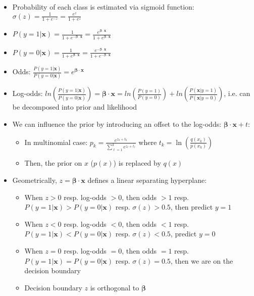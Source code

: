 \begin{itemize}
    \item Probability of each class is estimated via sigmoid function: $\sigma(z) = \frac{1}{1+e^{-z}} = \frac{e^{z}}{1+e^{z}}$
    \item $P(y=1|\boldsymbol{x}) = \frac{1}{1+e^{-\boldsymbol{\beta} \cdot \boldsymbol{x}}} = \frac{e^{\boldsymbol{\beta} \cdot \boldsymbol{x}}}{1+e^{\boldsymbol{\beta} \cdot \boldsymbol{x}}}$
    \item $P(y=0|\boldsymbol{x}) = \frac{1}{1+e^{\boldsymbol{\beta} \cdot \boldsymbol{x}}} = \frac{e^{-\boldsymbol{\beta} \cdot \boldsymbol{x}}}{1+e^{-\boldsymbol{\beta} \cdot \boldsymbol{x}}}$
    \item Odds: $\frac{P(y=1|\boldsymbol{x})}{P(y=0|\boldsymbol{x})} = e^{\boldsymbol{\beta} \cdot \boldsymbol{x}}$
    \item Log-odds: $ln(\frac{P(y=1|\boldsymbol{x})}{P(y=0|\boldsymbol{x})}) = \boldsymbol{\beta} \cdot \boldsymbol{x} = ln(\frac{P(y=1)}{P(y=0)}) + ln(\frac{P(\boldsymbol{x}|y=1)}{P(\boldsymbol{x}|y=0)})$, i.e. can be decomposed into prior and likelihood
    \item We can influence the prior by introducing an offset to the log-odds: $\boldsymbol{\beta} \cdot \boldsymbol{x} + t$:
    \begin{itemize}
        \item In multinomial case: $
        p_k = \frac{e^{z_k + t_k}}{\sum_{\ell=1}^k e^{z_\ell + t_\ell}}
        $ where $t_k = \ln(\frac{q(x_k)}{p(x_k)})$
        \item Then, the prior on $x$ ($p(x)$) is replaced by $q(x)$
    \end{itemize}
    \item Geometrically, $z = \boldsymbol{\beta} \cdot \boldsymbol{x}$ defines a linear separating hyperplane:
    \begin{itemize}
        \item When $z > 0$ resp. log-odds $> 0$, then odds $> 1$ resp. $P(y=1|\boldsymbol{x}) > P(y=0|\boldsymbol{x})$ resp. $\sigma(z) > 0.5$, then predict $y = 1$
        \item When $z < 0$ resp. log-odds $< 0$, then odds $< 1$ resp. $P(y=1|\boldsymbol{x}) < P(y=0|\boldsymbol{x})$ resp. $\sigma(z) < 0.5$, predict $y = 0$
        \item When $z = 0$ resp. log-odds $= 0$, then odds $= 1$ resp. $P(y=1|\boldsymbol{x}) = P(y=0|\boldsymbol{x})$ resp. $\sigma(z) = 0.5$, then we are on the decision boundary
        \item Decision boundary $z$ is orthogonal to $\boldsymbol{\beta}$\\

\end{itemize}
\end{itemize}
